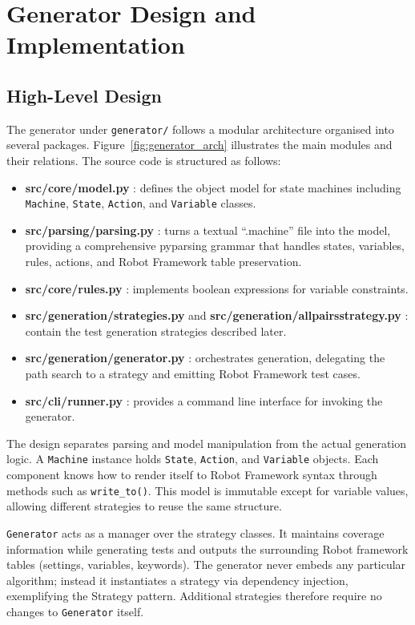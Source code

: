 \section{Generator Design and Implementation}

\subsection{High-Level Design}

The generator under \texttt{generator/} follows a modular architecture
organised into several packages.  Figure~\ref{fig:generator_arch}
illustrates the main modules and their relations.  The source code is structured as follows:

\begin{itemize}
  \item \textbf{src/core/model.py} : defines the object model for state machines including \texttt{Machine}, \texttt{State}, \texttt{Action}, and \texttt{Variable} classes.
  \item \textbf{src/parsing/parsing.py} : turns a textual ``.machine'' file into the
    model, providing a comprehensive pyparsing grammar that handles states,
    variables, rules, actions, and Robot Framework table preservation.
  \item \textbf{src/core/rules.py} : implements boolean expressions for variable
    constraints.
  \item \textbf{src/generation/strategies.py} and \textbf{src/generation/allpairsstrategy.py} : contain the
    test generation strategies described later.
  \item \textbf{src/generation/generator.py} : orchestrates generation, delegating the path
    search to a strategy and emitting Robot Framework test cases.
  \item \textbf{src/cli/runner.py} : provides a command line interface for invoking
    the generator.
\end{itemize}

The design separates parsing and model manipulation from the actual generation
logic.  A \texttt{Machine} instance holds \texttt{State}, \texttt{Action}, and
\texttt{Variable} objects.  Each component knows how to render itself to Robot
Framework syntax through methods such as \texttt{write\_to()}.  This model is
immutable except for variable values, allowing different strategies to reuse the
same structure.

\texttt{Generator} acts as a manager over the strategy classes.  It maintains
coverage information while generating tests and outputs the surrounding Robot
framework tables (settings, variables, keywords).  The generator never embeds
any particular algorithm; instead it instantiates a strategy via dependency
injection, exemplifying the Strategy pattern.  Additional strategies therefore
require no changes to \texttt{Generator} itself.

